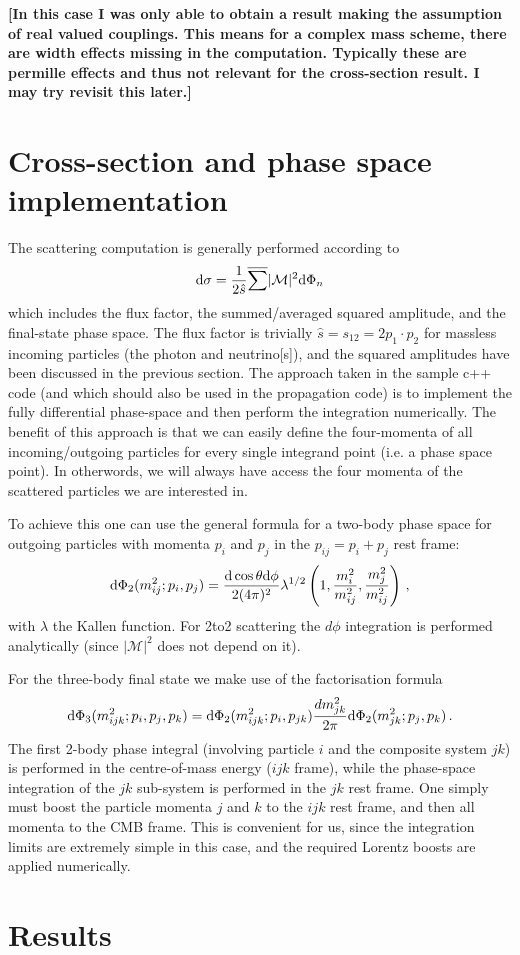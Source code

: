 \documentclass[a4paper,11pt]{article}
\def \beq{\begin{equation}}
\def \eeq{\end{equation}}
\newcommand{\alert}[1]{{\bf \color{red}[{#1}]}}
\begin{document}
\alert{In this case I was only able to obtain a result making the assumption of real valued couplings. This means for a complex mass scheme, there are width effects missing in the computation. Typically these are permille effects and thus not relevant for the cross-section result. I may try revisit this later.}

\section{Cross-section and phase space implementation}
The scattering computation is generally performed according to
%
\beq
{\rm d} \sigma = \frac{1}{2 \hat{s}} \overline{\sum} |\mathcal{M}|^2 {\rm d}\Phi_n
\eeq
%
which includes the flux factor, the summed/averaged squared amplitude, and the final-state phase space. 
%
The flux factor is trivially $\hat{s} = s_{12} = 2 p_1 \cdot p_2$ for massless incoming particles (the photon and neutrino[s]), and the squared amplitudes have been discussed in the previous section.
%
The approach taken in the sample c++ code (and which should also be used in the propagation code) is to implement the fully differential phase-space and then perform the integration numerically. The benefit of this approach is that we can easily define the four-momenta of all incoming/outgoing particles for every single integrand point (i.e. a phase space point). In otherwords, we will always have access the four momenta of the scattered particles we are interested in.

To achieve this one can use the general formula for a two-body phase space for outgoing particles with momenta $p_i$ and $p_j$ in the $p_{ij} = p_i + p_j$ rest frame:
%
\beq
{\rm d}\Phi_2(m_{ij}^2;p_i,p_j) = \frac{\rm d \cos \theta d \phi}{2(4\pi)^2} \lambda^{1/2}\left(1,\frac{m_i^2}{m_{ij}^2},\frac{m_j^2}{m_{ij}^2}\right)\,,
\eeq
%
with $\lambda$ the Kallen function.
%
For 2to2 scattering the $d\phi$ integration is performed analytically (since $|\mathcal{M}|^2$ does not depend on it).

For the three-body final state we make use of the factorisation formula
%
\beq
{\rm d}\Phi_3(m_{ijk}^2;p_i,p_j,p_k) = {\rm d}\Phi_2(m_{ijk}^2;p_i,p_{jk}) \frac{d m_{jk}^2}{2 \pi} {\rm d}\Phi_2(m_{jk}^2;p_j,p_k)\,.
\eeq
%
The first 2-body phase integral (involving particle $i$ and the composite system $jk$) is performed in the centre-of-mass energy ($ijk$ frame), while the phase-space integration of the $jk$ sub-system is performed in the $jk$ rest frame. One simply must boost the particle momenta $j$ and $k$ to the $ijk$ rest frame, and then all momenta to the CMB frame.
%
This is convenient for us, since the integration limits are extremely simple in this case, and the required Lorentz boosts are applied numerically.

\section{Results}


\end{document}
